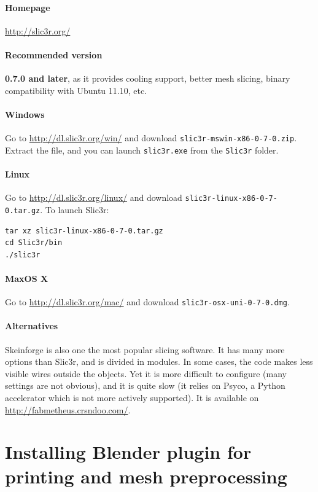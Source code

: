 \documentclass{article}
\begin{document}
	\paragraph{Homepage} \url{http://slic3r.org/}

	\paragraph{Recommended version} \textbf{0.7.0 and later}, as it provides cooling support, better mesh slicing, binary compatibility with Ubuntu 11.10, etc.

	\paragraph{Windows} Go to \url{http://dl.slic3r.org/win/} and download \texttt{slic3r-mswin-x86-0-7-0.zip}. Extract the file, and you can launch \texttt{slic3r.exe} from the \texttt{Slic3r} folder.

	\paragraph{Linux} Go to \url{http://dl.slic3r.org/linux/} and download \texttt{slic3r-linux-x86-0-7-0.tar.gz}. To launch Slic3r:
		\begin{verbatim}
tar xz slic3r-linux-x86-0-7-0.tar.gz
cd Slic3r/bin
./slic3r
		\end{verbatim}

	\paragraph{MaxOS X} Go to \url{http://dl.slic3r.org/mac/} and download \texttt{slic3r-osx-uni-0-7-0.dmg}. %

	\paragraph{Alternatives} Skeinforge is also one the most popular slicing software. It has many more options than Slic3r, and is divided in modules. In some cases, the code makes less visible wires outside the objects. Yet it is more difficult to configure (many settings are not obvious), and it is quite slow (it relies on Psyco, a Python accelerator which is not more actively supported). It is available on \url{http://fabmetheus.crsndoo.com/}.

\newpage

\section{Installing Blender plugin for printing and mesh preprocessing}
\end{document}
